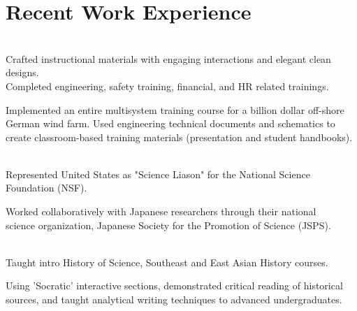 \documentclass[]{deedy-resume-openfont}
\begin{document}
\begin{minipage}[t]{0.71\textwidth}
\section{Recent Work Experience}
 \\
\vspace{.6mm}
\vspace{.6mm}
Crafted instructional materials with engaging interactions and elegant clean designs. \\
Completed engineering, safety training, financial, and HR related trainings.
\vspace{.8mm}
\begin{tightemize}
\item Implemented an entire multisystem training course for a billion dollar off-shore
German wind farm. Used engineering technical documents and schematics to \\
create classroom-based training materials (presentation and student handbooks).
\end{tightemize}
\sectionsep
\vspace{\topsep} %

 \\
\vspace{.6mm}
\vspace{.6mm}
Represented United States as "Science Liason" for the National Science Foundation (NSF). \\
\vspace{.5mm}
\begin{tightemize}
\item Worked collaboratively with Japanese researchers through their national \\
science organization, Japanese Society for the Promotion of Science (JSPS).
\end{tightemize}
\sectionsep
\vspace{\topsep} %

 \\
\vspace{.6mm}
\vspace{.6mm}
Taught intro History of Science, Southeast and East Asian History courses. \\
\vspace{.5mm}
\begin{tightemize}
\item Using 'Socratic' interactive sections, demonstrated critical reading of historical
sources, and taught analytical writing techniques to advanced undergraduates.
\end{tightemize}
\sectionsep



\end{minipage}
\end{document}
